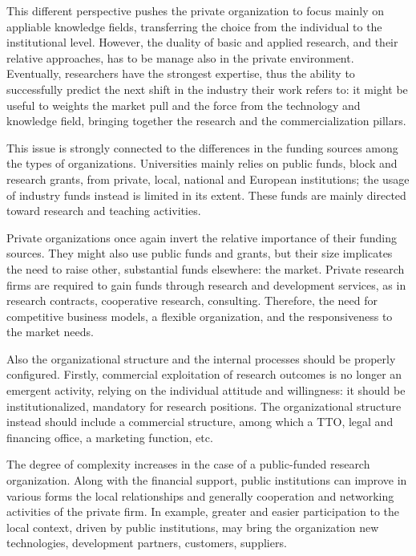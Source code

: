 This different perspective pushes the private organization to focus mainly on appliable knowledge fields, transferring the choice from the individual to the institutional level. However, the duality of basic and applied research, and their relative approaches, has to be manage also in the private environment. Eventually, researchers have the strongest expertise, thus the ability to successfully predict the next shift in the industry their work refers to: it might be useful to weights the market pull and the force from the technology and knowledge field, bringing together the research and the commercialization pillars. 

This issue is strongly connected to the differences in the funding sources among the types of organizations. Universities mainly relies on public funds, block and research grants, from private, local, national and European institutions; the usage of industry funds instead is limited in its extent. These funds are mainly directed toward research and teaching activities. 

Private organizations once again invert the relative importance of their funding sources. They might also use public funds and grants, but their size implicates the need to raise other, substantial funds elsewhere: the market. Private research firms are required to gain funds through research and development services, as in research contracts, cooperative research, consulting. Therefore, the need for competitive business models, a flexible organization, and the responsiveness to the market needs.

Also the organizational structure and the internal processes should be properly configured. Firstly, commercial exploitation of research outcomes is no longer an emergent activity, relying on the individual attitude and willingness: it should be institutionalized, mandatory for research positions. The organizational structure instead should include a commercial structure, among which a TTO, legal and financing office, a marketing function, etc.

The degree of complexity increases in the case of a public-funded research organization. Along with the financial support, public institutions can improve in various forms the local relationships and generally cooperation and networking activities of the private firm. In example, greater and easier participation to the local context, driven by public institutions, may bring the organization new technologies, development partners, customers, suppliers.  

